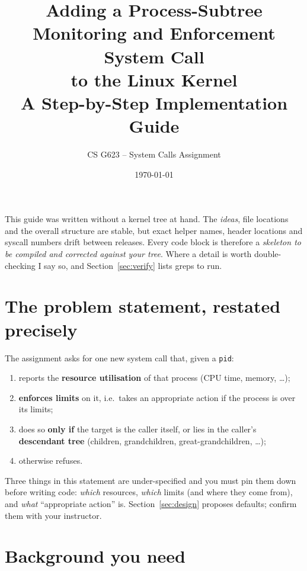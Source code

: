 \documentclass[11pt,a4paper]{article}
\title{Adding a Process-Subtree Monitoring and Enforcement System Call\\to the Linux Kernel\\[2pt]\large A Step-by-Step Implementation Guide}
\author{CS G623 -- System Calls Assignment}
\date{\today}
\begin{document}
\maketitle
\tableofcontents
\bigskip

\begin{tcolorbox}[colback=blue!4,colframe=blue!50!black,title=Read this first,fonttitle=\bfseries\small]
This guide was written without a kernel tree at hand. The \emph{ideas}, file locations and the
overall structure are stable, but exact helper names, header locations and syscall numbers drift
between releases. Every code block is therefore a \emph{skeleton to be compiled and corrected against
your tree}. Where a detail is worth double-checking I say so, and Section~\ref{sec:verify} lists
greps to run.
\end{tcolorbox}

\section{The problem statement, restated precisely}
The assignment asks for one new system call that, given a \texttt{pid}:

\begin{enumerate}[label=\textbf{R\arabic*.}]
  \item reports the \textbf{resource utilisation} of that process (CPU time, memory, \dots);
  \item \textbf{enforces limits} on it, i.e.\ takes an appropriate action if the process is over its limits;
  \item does so \textbf{only if} the target is the caller itself, or lies in the caller's
        \textbf{descendant tree} (children, grandchildren, great-grandchildren, \dots);
  \item otherwise refuses.
\end{enumerate}

Three things in this statement are under-specified and you must pin them down before writing code:
\emph{which} resources, \emph{which} limits (and where they come from), and \emph{what} ``appropriate action'' is.
Section~\ref{sec:design} proposes defaults; confirm them with your instructor.

\section{Background you need}
\end{document}
